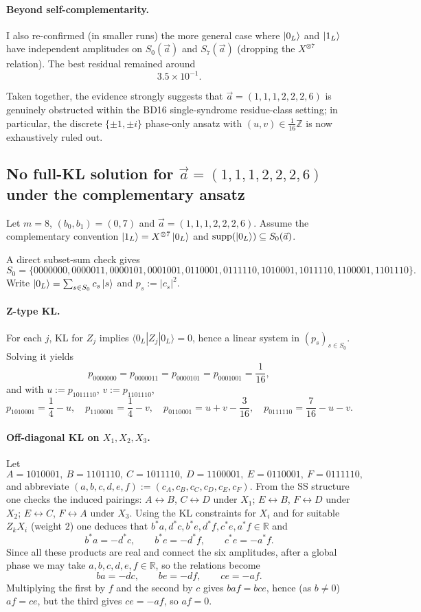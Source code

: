 \documentclass[11pt]{article}
\begin{document}
\paragraph{Beyond self-complementarity.}
I also re-confirmed (in smaller runs) the more general case where \(\ket{0_L}\) and \(\ket{1_L}\) have independent amplitudes on
\(S_0(\vec a)\) and \(S_7(\vec a)\) (dropping the \(X^{\otimes 7}\) relation). The best residual remained around
\[
3.5\times 10^{-1}.
\]

Taken together, the evidence strongly suggests that \(\vec a=(1,1,1,2,2,2,6)\) is genuinely obstructed
within the BD16 single-syndrome residue-class setting; in particular, the discrete
\(\{\pm 1,\pm i\}\) phase-only ansatz with \((u,v)\in\frac1{16}\mathbb{Z}\) is now exhaustively ruled out.

\subsection{No full-KL solution for $\vec a=(1,1,1,2,2,2,6)$ under the complementary ansatz}

Let $m=8$, $(b_0,b_1)=(0,7)$ and $\vec a=(1,1,1,2,2,2,6)$.
Assume the complementary convention $\ket{1_L}=X^{\otimes 7}\ket{0_L}$ and $\text{supp}(\ket{0_L})\subseteq S_0(\vec a)$.

A direct subset-sum check gives
\[
S_0=\{0000000,0000011,0000101,0001001,0110001,0111110,1010001,1011110,1100001,1101110\}.
\]
Write $\ket{0_L}=\sum_{s\in S_0} c_s\ket{s}$ and $p_s:=|c_s|^2$.

\paragraph{Z-type KL.}
For each $j$, KL for $Z_j$ implies $\langle 0_L|Z_j|0_L\rangle=0$, hence a linear system in $(p_s)_{s\in S_0}$.
Solving it yields
\[
p_{0000000}=p_{0000011}=p_{0000101}=p_{0001001}=\frac{1}{16},
\]
and with $u:=p_{1011110}$, $v:=p_{1101110}$,
\[
p_{1010001}=\frac14-u,\quad p_{1100001}=\frac14-v,\quad
p_{0110001}=u+v-\frac{3}{16},\quad p_{0111110}=\frac{7}{16}-u-v.
\]

\paragraph{Off-diagonal KL on $X_1,X_2,X_3$.}
Let
\[
A=1010001,\ B=1101110,\ C=1011110,\ D=1100001,\ E=0110001,\ F=0111110,
\]
and abbreviate $(a,b,c,d,e,f):=(c_A,c_B,c_C,c_D,c_E,c_F)$.
From the SS structure one checks the induced pairings:
$A\leftrightarrow B$, $C\leftrightarrow D$ under $X_1$;
$E\leftrightarrow B$, $F\leftrightarrow D$ under $X_2$;
$E\leftrightarrow C$, $F\leftrightarrow A$ under $X_3$.
Using the KL constraints for $X_i$ and for suitable $Z_kX_i$ (weight $2$) one deduces that
$b^*a,d^*c,b^*e,d^*f,c^*e,a^*f\in\mathbb R$ and
\[
b^*a=-d^*c,\qquad b^*e=-d^*f,\qquad c^*e=-a^*f.
\]
Since all these products are real and connect the six amplitudes, after a global phase we may take
$a,b,c,d,e,f\in\mathbb R$, so the relations become
\[
ba=-dc,\qquad be=-df,\qquad ce=-af.
\]
Multiplying the first by $f$ and the second by $c$ gives $baf=bce$, hence (as $b\neq0$) $af=ce$,
but the third gives $ce=-af$, so $af=0$.
\end{document}
